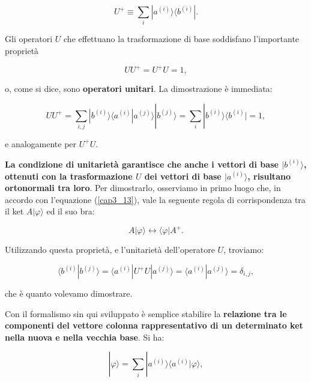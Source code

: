 \begin{equation}
U^+ \equiv \sum \limits_{i} | a^{(i)} \rangle \langle b^{(i)} |  .
\end{equation}

Gli operatori $U$ che effettuano la trasformazione di base soddisfano l'importante proprietà

\begin{equation}
UU^+= U^+U=1 ,
\end{equation}

o, come si dice, sono \textbf{operatori unitari}. La dimostrazione è immediata:

\begin{equation}
UU^+ = \sum\limits_{i,j}  | b^{(i)} \rangle \langle a^{(i)} | a^{(j)} \rangle | b^{(j)} \rangle = 
\sum\limits_{i} | b^{(i)} \rangle \langle b^{(i)} | = 1 ,
\end{equation}

e analogamente per $U^+U$.

\textbf{La condizione di unitarietà garantisce che anche i vettori di base $| b^{(i)} \rangle $, ottenuti con la trasformazione $U$ dei vettori di base $| a^{(i)} \rangle $, risultano ortonormali tra loro}. Per dimostrarlo, osserviamo in primo luogo che, in accordo con l'equazione (\ref{cap3_13}), vale la seguente regola di corrispondenza tra il ket $A | \varphi \rangle $ ed il suo bra:

\begin{equation}
A | \varphi \rangle  \leftrightarrow   \langle \varphi  | A^+ .
\end{equation}

Utilizzando questa proprietà, e l'unitarietà dell'operatore $U$, troviamo:

\begin{equation}
\langle b^{(i)} | b^{(j)} \rangle = \langle a^{(i)} | U^{+}U | a^{(j)} \rangle = \langle a^{(i)} |  a^{(j)} \rangle = \delta_{i,j} ,
\end{equation}

che è quanto volevamo dimostrare.

Con il formalismo sin qui sviluppato è semplice stabilire la \textbf{relazione tra le componenti del vettore colonna rappresentativo di un determinato ket nella nuova e nella vecchia base}. Si ha:

\begin{equation}
| \varphi \rangle = \sum \limits_{i}  | a^{(i)} \rangle \langle a^{(i)} | \varphi  \rangle ,
\end{equation}

